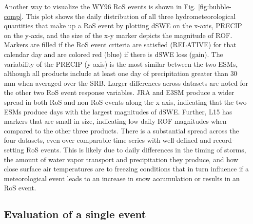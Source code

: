 \documentclass[nhess, manuscript]{copernicus}
\begin{document}
Another way to visualize the WY96 RoS events is shown in Fig. \ref{fig:bubble-comp}.
This plot shows the daily distribution of all three hydrometeorological quantities that make up a RoS event by plotting dSWE on the x-axis, PRECIP on the y-axis, and the size of the x-y marker depicts the magnitude of ROF.
Markers are filled if the RoS event criteria are satisfied (RELATIVE) for that calendar day and are colored red (blue) if there is dSWE loss (gain).
The variability of the PRECIP (y-axis) is the most similar between the two ESMs, although all products include at least one day of precipitation greater than 30 mm when averaged over the SRB.
Larger differences across datasets are noted for the other two RoS event response variables.
JRA and E3SM produce a wider spread in both RoS and non-RoS events along the x-axis, indicating that the two ESMs produce days with the largest magnitudes of dSWE.
Further, L15 has markers that are small in size, indicating low daily ROF magnitudes when compared to the other three products.
There is a substantial spread across the four datasets, even over comparable time series with well-defined and record-setting RoS events.
This is likely due to daily differences in the timing of storms, the amount of water vapor transport and precipitation they produce, and how close surface air temperatures are to freezing conditions that in turn influence if a meteorological event leads to an increase in snow accumulation or results in an RoS event.

\subsection{Evaluation of a single event}
\label{subsec:evaluationsingleevent}


\end{document}

